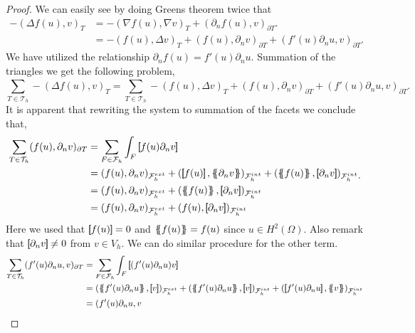 \begin{proof}
  We can easily see by doing Greens theorem twice that \[
    \begin{split}
-(\Delta f( u) , v)_{T } &= -(\nabla f( u), \nabla v  )_{T } + ( \partial _{n}  f( u), v )_{\partial T }.\\
                    & = -( f( u), \Delta v )_{T} + (f( u), \partial _{n} v  )_{\partial T} + (   f'( u)\partial _{n}u, v )_{\partial T } .
    \end{split}
\]
We have utilized the relationship $\partial _{n} f(u) = f' ( u) \partial _{n}u$.
 Summation of the triangles we get the following problem,
\[
\sum_{T \in  \mathcal{T} _{h} }^{} -(\Delta f( u) , v)_{T } = \sum_{T \in \mathcal{T} _{h}}^{}  -( f( u), \Delta v )_{T} + (f( u), \partial _{n} v  )_{\partial T} + (   f'( u)\partial _{n}u, v )_{\partial T }.
\]
It is apparent that rewriting the system to summation of the facets we conclude that, \[
    \begin{split}
\sum_{T \in \mathcal{T}_{h} }^{} ( f( u) , \partial _{n}v)_{\partial T} & =  \sum_{F \in \mathcal{F}_{h} }^{} \int_{F}^{}  \jump{    f( u) \partial _{n}v}   \\
& = ( f(u), \partial _{n} v)_{\mathcal{F}^{ext}_{h} }  +  ( \jump{f( u)} , \mean{ \partial _{n}v }  )_{\mathcal{F} _{h}^{int}} + ( \mean{f( u)}
, \jump{ \partial _{n}v }  )_{\mathcal{F}^{int}_{h} } \\
 & = ( f(u), \partial _{n} v)_{\mathcal{F}^{ext}_{h} } +   ( \mean{f( u)} , \jump{ \partial _{n}v }  )_{\mathcal{F}^{int}_{h} } \\
 & = ( f(u), \partial _{n} v)_{\mathcal{F}^{ext}_{h} } +  ( f( u) , \jump{ \partial _{n}v }  )_{\mathcal{F} _{h}^{int}}
    \end{split}
    .
\]
Here we used that $ \left[\!\!\left[  f( u)   \right]\!\!\right] = 0  $ and $\left\{\!\!\left\{ f( u)  \right\}\!\!\right\} = f( u)  $  since $u \in H^2( \Omega ) $. Also remark that $\left[\!\!\left[  \partial _{n}v  \right]\!\!\right] \neq 0   $ from $v \in V_{h}$. We can do similar procedure for the other term.
\[
    \begin{split}
        \sum_{T \in \mathcal{T} _{h}}^{} (   f'( u)\partial _{n}u, v )_{\partial T } &=  \sum_{F \in \mathcal{F}_{h} }^{} \int_{F}^{}  \jump{( f'( u)\partial _{n}u  ) v } \\
& = (\mean{ f'( u)\partial _{n}u }  , \jump{ v }   )_{\mathcal{F}^{ext}_{h} } + (\mean{ f'( u)\partial _{n}u }  , \jump{ v }   )_{\mathcal{F}^{int}_{h} } +  (\jump{ f'( u)\partial _{n}u }  , \mean{ v }   )_{\mathcal{F}^{int}_{h} } \\
                                                                             & =  ( f'( u)  \partial _{n}u   ,  v

\end{split}\]
\end{proof}

